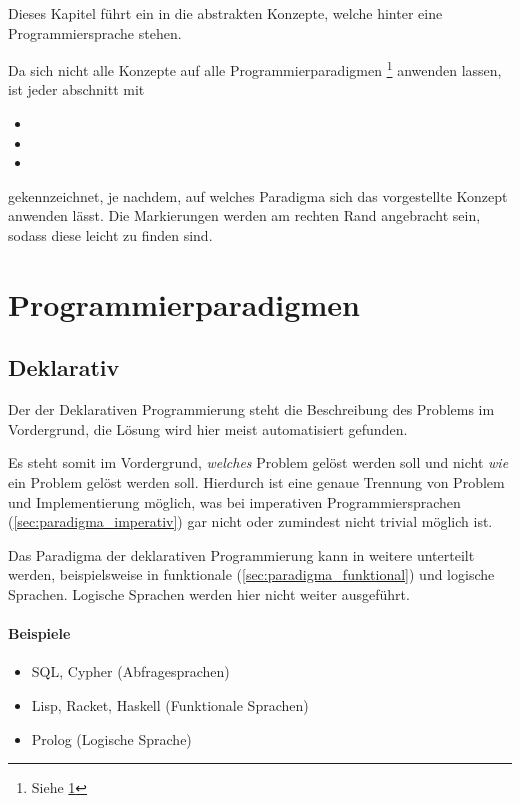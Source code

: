Dieses Kapitel führt ein in die abstrakten Konzepte, welche hinter eine Programmiersprache stehen.

Da sich nicht alle Konzepte auf alle Programmierparadigmen \footnote{Siehe \ref{sec:paradigmen}} anwenden lassen, ist jeder abschnitt mit
\begin{itemize}
	\item[] \functional
	\item[] \imperative
	\item[] \oop
\end{itemize}
gekennzeichnet, je nachdem, auf welches Paradigma sich das vorgestellte Konzept anwenden lässt. Die Markierungen werden am rechten Rand angebracht sein, sodass diese leicht zu finden sind.

\section{Programmierparadigmen}
	\label{sec:paradigmen}
	
	\subsection{Deklarativ}
		\label{sec:paradigma_deklarativ}
	
		Der der Deklarativen Programmierung steht die Beschreibung des Problems im Vordergrund, die Lösung wird hier meist automatisiert gefunden.
		
		Es steht somit im Vordergrund, \textit{welches} Problem gelöst werden soll und nicht \textit{wie} ein Problem gelöst werden soll. Hierdurch ist eine genaue Trennung von Problem und Implementierung möglich, was bei imperativen Programmiersprachen (\ref{sec:paradigma_imperativ}) gar nicht oder zumindest nicht trivial möglich ist.
		
		Das Paradigma der deklarativen Programmierung kann in weitere unterteilt werden, beispielsweise in funktionale (\ref{sec:paradigma_funktional}) und logische Sprachen. Logische Sprachen werden hier nicht weiter ausgeführt.
		
		\paragraph{Beispiele}
			\begin{itemize}
				\item SQL, Cypher (Abfragesprachen)
				\item Lisp, Racket, Haskell (Funktionale Sprachen)
				\item Prolog (Logische Sprache)
			\end{itemize}
	
